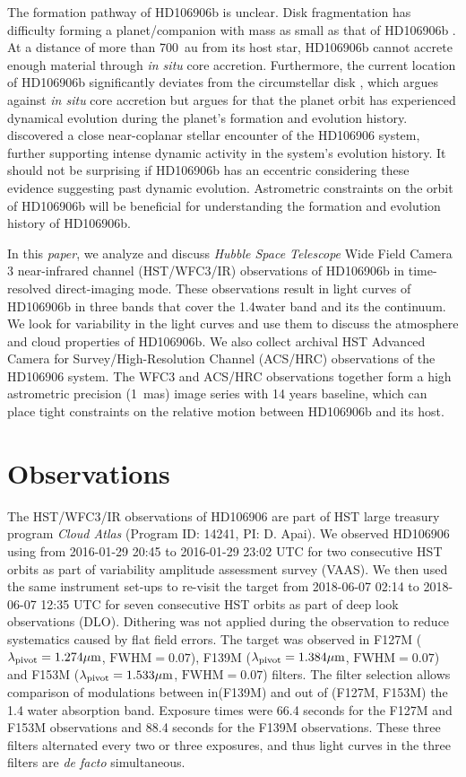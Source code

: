 \documentclass[twocolumn]{aastex62}
\begin{document}
The formation pathway of HD106906b is unclear. Disk fragmentation has difficulty forming a planet/companion with mass as small as that of HD106906b \citep[e.g.,][]{Kratter2010}. At a distance of more than 700~au from its host star, HD106906b cannot accrete enough material through \emph{in situ} core accretion. Furthermore, the current location of HD106906b significantly deviates from the circumstellar disk \citep{Bailey2013,Kalas2015}, which argues against \emph{in situ} core accretion but argues for that the planet orbit has experienced dynamical evolution during the planet's formation and evolution history. \citep{DeRosa2019} discovered a close near-coplanar stellar encounter of the HD106906 system, further supporting intense dynamic activity in the system's evolution history. It should not be surprising if HD106906b has an eccentric considering these evidence suggesting past dynamic evolution. Astrometric constraints on the orbit of HD106906b will be beneficial for understanding the formation and evolution history of HD106906b.

In this \emph{paper}, we analyze and discuss \emph{Hubble Space Telescope} Wide Field Camera 3 near-infrared channel (HST/WFC3/IR) observations of HD106906b in time-resolved direct-imaging mode. These observations result in light curves of HD106906b in three bands that cover the 1.4\micron water band and its the continuum. We look for variability in the light curves and use them to discuss the atmosphere and cloud properties of HD106906b. We also collect archival HST Advanced Camera for Survey/High-Resolution Channel (ACS/HRC) observations of the HD106906 system. The WFC3 and ACS/HRC observations together form a high astrometric precision (1~mas) image series with 14 years baseline,  which can place tight constraints on the relative motion between HD106906b and its host.

\section{Observations}
The HST/WFC3/IR observations of HD106906 are part of HST large treasury program \emph{Cloud Atlas} (Program ID: 14241, PI: D. Apai). We observed HD106906 using from 2016-01-29 20:45 to 2016-01-29 23:02 UTC for two consecutive HST orbits as part of variability amplitude assessment survey (VAAS). We then used the same instrument set-ups to re-visit the target from 2018-06-07 02:14 to 2018-06-07 12:35 UTC  for seven consecutive HST orbits as part of deep look observations (DLO). Dithering was not applied during the observation to reduce systematics caused by flat field errors. The target was observed in F127M ($\lambda_{\mathrm{pivot}}=1.274\mbox{$\mu$m}$, $\mathrm{FWHM}=0.07$), F139M ($\lambda_{\mathrm{pivot}}=1.384\mbox{$\mu$m}$, $\mathrm{FWHM}=0.07$) and F153M ($\lambda_{\mathrm{pivot}}=1.533\mbox{$\mu$m}$, $\mathrm{FWHM}=0.07$) filters.  The filter selection allows comparison of modulations between in(F139M) and out of (F127M, F153M) the 1.4 \micron{} water absorption band.  Exposure times were 66.4 seconds for the F127M and F153M observations and 88.4 seconds for the F139M observations. These three filters alternated  every two or three exposures, and thus  light curves in the three filters are \emph{de facto} simultaneous. 
\end{document}
